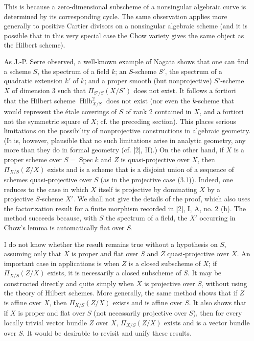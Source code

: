 This is because a zero-dimensional subscheme of a nonsingular algebraic curve
is determined by its corresponding cycle. The same observation applies more
generally to positive Cartier divisors on a nonsingular algebraic scheme (and
it is possible that in this very special case the Chow variety gives the same
object as the Hilbert scheme).


As J.-P. Serre observed, a well-known example of Nagata shows that one can find
a scheme $S$, the spectrum of a field $k$; an $S$-scheme $S'$, the spectrum of
a quadratic extension $k'$ of $k$; and a proper smooth (but nonprojective)
$S'$-scheme $X$ of dimension 3 such that $\Pi_{S'/S}(X/S')$ does not exist. It
follows a fortiori that the Hilbert scheme $\operatorname{Hilb}^2_{X/S}$ does
not exist (nor even the $k$-scheme that would represent the étale coverings of
$S$ of rank 2 contained in $X$, and a fortiori not the symmetric square of
$X$; cf. the preceding section). This places serious limitations on the
possibility of nonprojective constructions in algebraic geometry. (It is,
however, plausible that no such limitations arise in analytic geometry, any
more than they do in formal geometry (cf. [2], II).) On the other hand, if $X$
is a proper scheme over $S=\operatorname{Spec}k$ and $Z$ is quasi-projective
over $X$, then $\Pi_{X/S}(Z/X)$ exists and is a scheme that is a disjoint union
of a sequence of schemes quasi-projective over $S$ (as in the projective case
(3.1)). Indeed, one reduces to the case in which $X$ itself is projective by
dominating $X$ by a projective $S$-scheme $X'$. We shall not give the details
of the proof, which also uses the factorization result for a finite morphism
recorded in [2], I, A, no. 2 (b). The method succeeds because, with $S$ the
spectrum of a field, the $X'$ occurring in Chow's lemma is automatically flat
over $S$.

I do not know whether the result remains true without a hypothesis on $S$,
assuming only that $X$ is proper and flat over $S$ and $Z$ quasi-projective
over $X$. An important case in applications is when $Z$ is a closed subscheme
of $X$; if $\Pi_{X/S}(Z/X)$ exists, it is necessarily a closed subscheme of
$S$. It may be
constructed directly and quite simply when $X$ is projective over $S$, without
using the theory of Hilbert schemes. More generally, the same method shows that
if $Z$ is affine over $X$, then $\Pi_{X/S}(Z/X)$ exists and is affine over $S$.
It also shows that if $X$ is proper and flat over $S$ (not necessarily
projective over $S$), then for every locally trivial vector bundle $Z$ over
$X$, $\Pi_{X/S}(Z/X)$ exists and is a vector bundle over $S$. It would be
desirable to revisit and unify these results.

